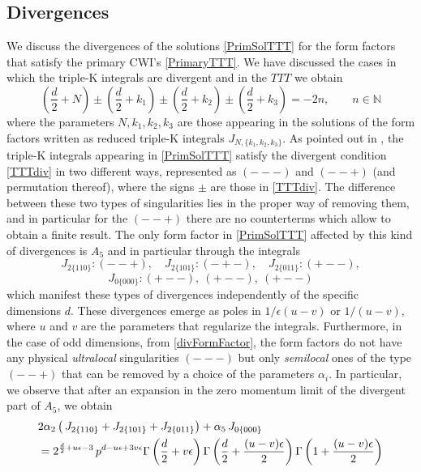 \documentclass[a4paper,11pt,openright,twoside]{book}
\let\a=\alpha   \let\b=\beta   \let\g=\gamma   \let\d=\delta
\let\e=\epsilon \let\z=\zeta   \let\h=\eta     \let\q=\theta
\numberwithin{equation}{section}
\begin{document}
{{{\subsection{Divergences}
We discuss the divergences of the solutions \eqref{PrimSolTTT} for the form factors that satisfy the primary CWI's \eqref{PrimaryTTT}. We have discussed the cases in which the triple-K integrals are divergent and in the $TTT$ we obtain 
\begin{equation}
	\left(\frac{d}{2}+N\right)\pm\left(\frac{d}{2}+k_1\right)\pm\left(\frac{d}{2}+k_2\right)\pm\left(\frac{d}{2}+k_3\right)=-2n,\qquad n\in\mathbb{N}\label{TTTdiv}
\end{equation}
where the parameters $N,k_1,k_2,k_3$ are those appearing in the solutions of the form factors written as reduced triple-K integrals $J_{N,\{k_1,k_2,k_3\}}$. 
As pointed out in \cite{Bzowski:2017poo}, the triple-K integrals appearing in \eqref{PrimSolTTT} satisfy the divergent condition \eqref{TTTdiv} in two different ways, represented as $(---)$ and $(--+)$ (and permutation thereof), where the signs $\pm$ are those in \eqref{TTTdiv}. The difference between these two types of singularities lies in the proper way of removing them, and in particular for the $(--+)$ there are no counterterms which allow to obtain a finite result. The only form factor in \eqref{PrimSolTTT} affected by this kind of divergences is $A_5$ and in particular through the integrals
\begin{equation}
	J_{2\{110\}}: (--+),\quad
	J_{2\{101\}}:(-+-),\quad
	J_{2\{011\}}:(+--),
\end{equation}
\begin{equation}
	J_{0\{000\}}:(+--),\ (+--),\ (+--)
\end{equation}
which manifest these types of divergences independently of the specific dimensions $d$. These divergences emerge as poles in $1/\e(u-v)$ or $1/(u-v)$, where $u$ and $v$ are the parameters that regularize the integrals. 
Furthermore, in the case of odd dimensions, from \eqref{divFormFactor}, the form factors do not have any physical \emph{ultralocal} singularities $(---)$ but only \emph{semilocal} ones of the type $(--+)$ that can be removed by a choice of the parameters $\a_i$. In particular, we observe that after an expansion in the zero momentum limit of the divergent part of $A_5$, we obtain
\begin{align}
	&2\a_2\,\big(\,J_{2\{110\}}+J_{2\{101\}}+J_{2\{011\}}\big)+\a_5\,J_{0\{000\}}\notag\\
	&=2^{\frac{d}{2}+u\e-3}\,p^{d-u\epsilon+3v\e}\Gamma\left(\frac{d}{2}+v\e\right)\Gamma\left(\frac{d}{2}+\frac{(u-v)\e}{2}\right)\Gamma\left(1+\frac{(u-v)\e}{2}\right)\notag\\

\end{align}}}}
\end{document}
